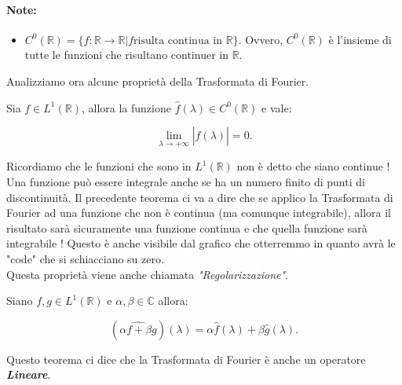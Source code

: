\paragraph{Note:}
\begin{itemize}
    \item $C^0(\mathbb{R}) = \{ f: \mathbb{R} \rightarrow \mathbb{R} | f \text{
                  risulta continua in } \mathbb{R} \}$. Ovvero, $C^0(\mathbb{R})$ è
          l'insieme di tutte le funzioni che risultano continuer in
          $\mathbb{R}$.
\end{itemize}

Analizziamo ora alcune proprietà della Trasformata di Fourier.

\begin{theorem}
    Sia $f \in L^1(\mathbb{R})$, allora la funzione $\hat{f}(\lambda) \in
        C^0(\mathbb{R})$ e vale:

    $$
        \lim_{\lambda \rightarrow +\infty} \left| \hat{f}(\lambda) \right| = 0.
    $$
\end{theorem}

Ricordiamo che le funzioni che sono in $L^1(\mathbb{R})$ non è detto che siano
continue ! Una funzione può essere integrale anche se ha un numero finito di
punti di discontinuità. Il precedente teorema ci va a dire che se applico la
Trasformata di Fourier ad una funzione che non è continua (ma comunque
integrabile), allora il risultato sarà sicuramente una funzione continua e
che quella funzione sarà integrabile ! Questo è anche visibile dal grafico che
otterremmo in quanto avrà le "code" che si schiacciano su zero.\\
Questa proprietà viene anche chiamata \textit{"Regolarizzazione"}.

\begin{theorem}
    Siano $f, g \in L^1(\mathbb{R})$ e $\alpha, \beta \in \mathbb{C}$ allora:

    $$
        (\widehat{ \alpha f + \beta g })(\lambda) = \alpha \hat{f}(\lambda) +
        \beta \hat{g}(\lambda).
    $$
\end{theorem}

Questo teorema ci dice che la Trasformata di Fourier è anche un operatore
\textbf{\textit{Lineare}}.\\

